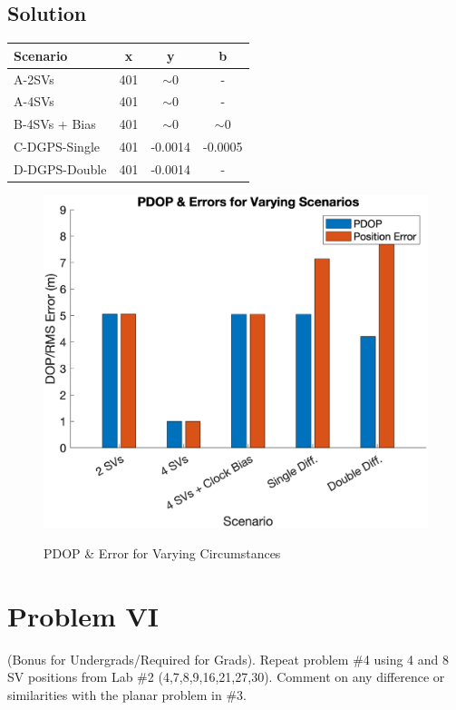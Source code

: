 \documentclass{article}
\begin{document}
\subsection*{Solution}

\begin{center}
    \begin{tabular}{ | l | c | c | c |}
        \hline
        Scenario & x & y & b \\ \hline
        A-2SVs & 401 & $\sim$0 & - \\ \hline
        A-4SVs & 401 & $\sim$0 & - \\ \hline
        B-4SVs + Bias & 401 & $\sim$0 & $\sim$0 \\ \hline
        C-DGPS-Single & 401 & -0.0014 & -0.0005 \\ \hline
        D-DGPS-Double & 401 & -0.0014 & - \\ \hline
    
    \end{tabular}
  \end{center}

\begin{figure}[H]
    \centering
    \includegraphics[width=0.75\linewidth]{../figures/p5_pdop.png}\label{fig:p5_pdop}
    \caption{PDOP \& Error for Varying Circumstances}
\end{figure}

\section*{Problem VI}
(Bonus for Undergrads/Required for Grads). Repeat problem \#4 using 4 and 8 SV positions
from Lab \#2 (4,7,8,9,16,21,27,30). Comment on any difference or similarities with the
planar problem in \#3.
\end{document}
